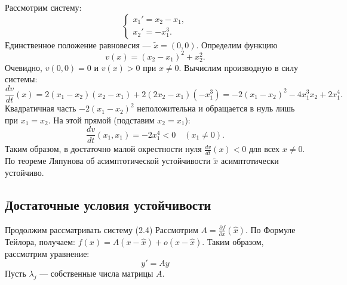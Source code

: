 \begin{example}
    Рассмотрим систему:
    \[
    \begin{cases}
        x_1' = x_2 - x_1, \\
        x_2' = -x_1^3.
    \end{cases}
    \]
    Единственное положение равновесия — \(\tilde{x} = (0, 0)\). Определим функцию
    \[
    v(x) = (x_2 - x_1)^2 + x_2^2.
    \]
    Очевидно, \(v(0,0)=0\) и \(v(x)>0\) при \(x \neq 0\). Вычислим производную в силу системы:
    \[
    \frac{dv}{dt}(x) = 2(x_1-x_2)(x_2-x_1) + 2(2x_2-x_1)(-x_1^3) = -2(x_1-x_2)^2 - 4x_1^3x_2 + 2x_1^4.
    \]
    Квадратичная часть \(-2(x_1-x_2)^2\) неположительна и обращается в нуль лишь при \(x_1=x_2\). На этой прямой (подставим \(x_2=x_1\)):
    \[
    \frac{dv}{dt}(x_1,x_1) = -2x_1^4 < 0 \quad (x_1 \neq 0).
    \]
    Таким образом, в достаточно малой окрестности нуля \(\frac{dv}{dt}(x) < 0\) для всех \(x \neq 0\). По теореме Ляпунова об асимптотической устойчивости \(\tilde{x}\) асимптотически устойчиво.
\end{example}

\subsection{Достаточные условия устойчивости}

Продолжим рассматривать систему (2.4) Рассмотрим \(A = \frac{\partial f}{\partial x}(\hat{x})\). По Формуле Тейлора, получаем: \(f(x) = A(x - \hat{x}) + o(x - \hat{x})\). Таким образом, рассмотрим уравнение:
\begin{equation}
    y' = Ay
\end{equation}
Пусть \(\lambda_j\) --- собственные числа матрицы \(A\).

